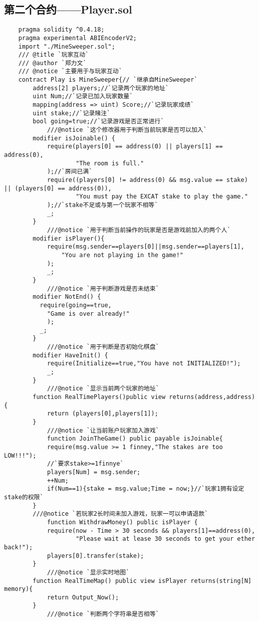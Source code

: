 \documentclass[UTF8]{ctexart}
\begin{document}
	\subsection{第二个合约——Player.sol}
	\begin{lstlisting}
	pragma solidity ^0.4.18;
	pragma experimental ABIEncoderV2;
	import "./MineSweeper.sol";
	/// @title `玩家互动`
	/// @author `郑力文`
	/// @notice `主要用于与玩家互动`
	contract Play is MineSweeper{// `继承自MineSweeper`
	    address[2] players;//`记录两个玩家的地址`
	    uint Num;//`记录已加入玩家数量`
	    mapping(address => uint) Score;//`记录玩家成绩`
	    uint stake;//`记录赌注`
	    bool going=true;//`记录游戏是否正常进行`
			///@notice `这个修改器用于判断当前玩家是否可以加入`
	    modifier isJoinable() {
	        require(players[0] == address(0) || players[1] == address(0),
	                "The room is full."
	        );//`房间已满`
	        require((players[0] != address(0) && msg.value == stake) || (players[0] == address(0)),
	                "You must pay the EXCAT stake to play the game."
	        );//`stake不足或与第一个玩家不相等`
	        _;
	    }
			///@notice `用于判断当前操作的玩家是否是游戏前加入的两个人`
	    modifier isPlayer(){
	        require(msg.sender==players[0]||msg.sender==players[1],
	            "You are not playing in the game!"
	        );
	        _;
	    }
			///@notice `用于判断游戏是否未结束`
	    modifier NotEnd() {
	      require(going==true,
	        "Game is over already!"
	        );
	      _;
	    }
			///@notice `用于判断是否初始化棋盘`
	    modifier HaveInit() {
	        require(Initialize==true,"You have not INITIALIZED!");
	        _;
	    }
			///@notice `显示当前两个玩家的地址`
	    function RealTimePlayers()public view returns(address,address){
	        return (players[0],players[1]);
	    }
			///@notice `让当前账户玩家加入游戏`
			function JoinTheGame() public payable isJoinable{
	        require(msg.value >= 1 finney,"The stakes are too LOW!!!");
	        //`要求stake>=1finnye`
	        players[Num] = msg.sender;
	        ++Num;
	        if(Num==1){stake = msg.value;Time = now;}//`玩家1拥有设定stake的权限`
	    }
	    ///@notice `若玩家2长时间未加入游戏，玩家一可以申请退款`
			function WithdrawMoney() public isPlayer {
	        require(now - Time > 30 seconds && players[1]==address(0),
					"Please wait at lease 30 seconds to get your ether back!");
	        players[0].transfer(stake);
	    }
			///@notice `显示实时地图`
	    function RealTimeMap() public view isPlayer returns(string[N] memory){
	        return Output_Now();
	    }
			///@notice `判断两个字符串是否相等`

\end{lstlisting}
\end{document}

